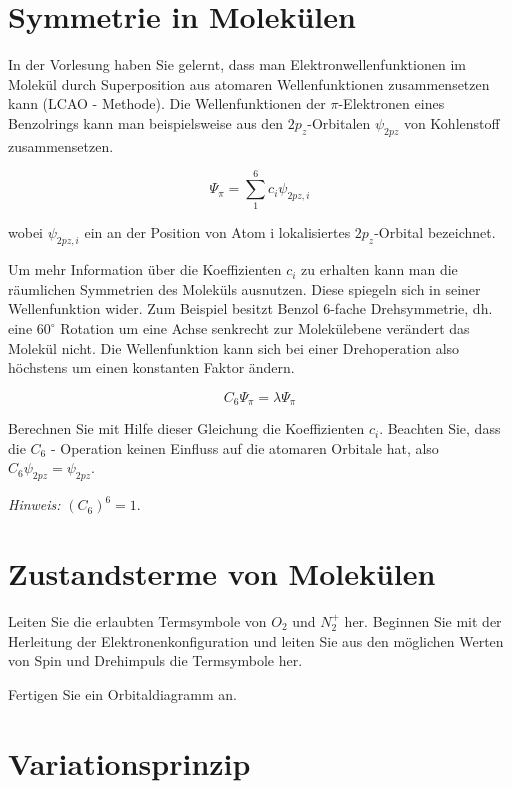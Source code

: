 \section{Symmetrie in Molekülen}


In der Vorlesung haben Sie gelernt, dass man Elektronwellenfunktionen im Molekül durch Superposition aus atomaren Wellenfunktionen zusammensetzen kann (LCAO - Methode). Die Wellenfunktionen der $\pi$-Elektronen eines Benzolrings kann man beispielsweise aus den $2p_z$-Orbitalen $\psi_{2pz}$ von Kohlenstoff zusammensetzen. 

$$ \Psi_\pi = \sum_1^6 c_i \psi_{2pz,i} $$

wobei $\psi_{2pz,i}$ ein an der Position von Atom i lokalisiertes $2p_z$-Orbital bezeichnet.
\bigskip

Um mehr Information über die Koeffizienten $c_i$ zu erhalten kann man die räumlichen Symmetrien des Moleküls ausnutzen. Diese spiegeln sich in seiner Wellenfunktion wider. Zum Beispiel besitzt Benzol 6-fache Drehsymmetrie, dh. eine $60^\circ$ Rotation um eine Achse senkrecht zur Molekülebene verändert das Molekül nicht. Die Wellenfunktion kann sich bei einer Drehoperation also höchstens um einen konstanten Faktor ändern.

$$ C_6 \Psi_\pi = \lambda \Psi_\pi $$

Berechnen Sie mit Hilfe dieser Gleichung die Koeffizienten $c_i$. Beachten Sie, dass die $C_6$ - Operation keinen Einfluss auf die atomaren Orbitale hat, also $C_6 \psi_{2pz} = \psi_{2pz}$.

\vspace{0.5cm}

\textit{Hinweis:} $(C_6)^6 = 1$.




\section{Zustandsterme von Molekülen}


Leiten Sie die erlaubten Termsymbole von $O_2$ und $N_2^+$ her. Beginnen Sie mit der Herleitung der Elektronenkonfiguration und leiten Sie aus den möglichen Werten von Spin und Drehimpuls die Termsymbole her.

Fertigen Sie ein Orbitaldiagramm an.


\section{Variationsprinzip}

